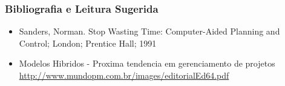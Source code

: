 \begin{frame}
 \frametitle{Bibliografia e Leitura Sugerida}
 \begin{itemize}
  \item Sanders, Norman. Stop Wasting Time: Computer-Aided Planning and Control; London; Prentice Hall; 1991
  \item Modelos Hibridos - Proxima tendencia em gerenciamento de projetos \url{http://www.mundopm.com.br/images/editorialEd64.pdf}
  \end{itemize}
\end{frame}